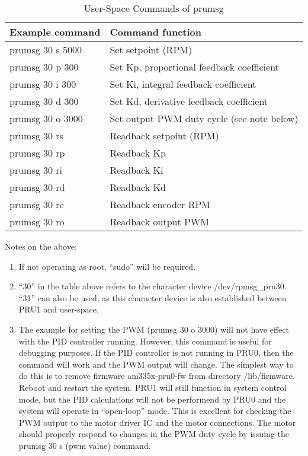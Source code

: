 \begin{longtable}{ll}
\caption{User-Space Commands of prumsg}\\
\toprule
Example command & Command function \\\midrule
prumsg 30 s 5000 & Set setpoint (RPM) \\ 
prumsg 30 p 300 & Set Kp, proportional feedback coefficient \\ 
prumsg 30 i 300 & Set Ki, integral feedback coefficient \\ 
prumsg 30 d 300 & Set Kd, derivative feedback coefficient \\ 
prumsg 30 o 3000 & Set output PWM duty cycle (see note below) \\ 
prumsg 30 rs & Readback setpoint (RPM) \\ 
prumsg 30 rp & Readback Kp \\ 
prumsg 30 ri & Readback Ki \\ 
prumsg 30 rd & Readback Kd \\ 
prumsg 30 re & Readback encoder RPM \\
prumsg 30 ro & Readback output PWM
\end{longtable}

Notes on the above:
\begin{enumerate}
\item If not operating as root, ``sudo'' will be required.
 
\item ``30'' in the table above refers to the character device /dev/rpmsg\_pru30.  ``31'' can also be used, as this character device is also established between PRU1 and user-space.
 
\item The example for setting the PWM (prumsg 30 o 3000) will not have effect with the PID controller running.  However, this command is useful for debugging purposes.  If the PID controller is not running in PRU0, then the command will work and the PWM output will change.  The simplest way to do this is to remove firmware am335x-pru0-fw from directory /lib/firmware.  Reboot and restart the system.  PRU1 will still function in system control mode, but the PID calculations will not be performend by PRU0 and the system will operate in ``open-loop'' mode.  This is excellent for checking the PWM output to the motor driver IC and the motor connections.  The motor should properly respond to changes in the PWM duty cycle by issuing the prumsg 30 s (pwm value) command.
\end{enumerate}
